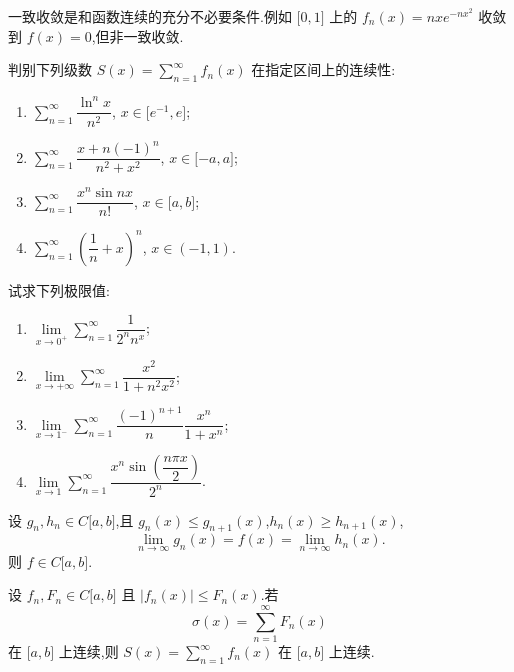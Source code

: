 \documentclass[../数学分析培优讲义.tex]{subfiles}
\begin{document}
\begin{remark}
一致收敛是和函数连续的充分不必要条件.例如 $\lbrack 0,1\rbrack$ 上的 $f_n(x)=nxe^{-nx^2}$ 收敛到 $f(x)=0$,但非一致收敛.
\end{remark}

\begin{example}
判别下列级数 $\displaystyle S(x)=\sum\limits_{n=1}^{\infty}f_n(x)$ 在指定区间上的连续性:
\begin{enumerate}[label=(\arabic*)]
    \item $\displaystyle\sum\limits_{n=1}^{\infty}\dfrac{\ln^n x}{n^2}$, $x\in\lbrack e^{-1},e\rbrack$;
    \item $\displaystyle\sum\limits_{n=1}^{\infty}\dfrac{x+n(-1)^n}{n^2+x^2}$, $x\in\lbrack -a,a\rbrack$;
    \item $\displaystyle\sum\limits_{n=1}^{\infty}\dfrac{x^n\sin nx}{n!}$, $x\in\lbrack a,b\rbrack$;
    \item $\displaystyle\sum\limits_{n=1}^{\infty}\left(\dfrac{1}{n}+x\right)^n$, $x\in(-1,1)$.
\end{enumerate}
\end{example}
\exampleblank

\begin{example}
试求下列极限值:
\begin{enumerate}[label=(\arabic*)]
    \item $\displaystyle\lim\limits_{x\to0^+}\sum\limits_{n=1}^{\infty}\dfrac{1}{2^n n^x}$;
    \item $\displaystyle\lim\limits_{x\to+\infty}\sum\limits_{n=1}^{\infty}\dfrac{x^2}{1+n^2x^2}$;
    \item $\displaystyle\lim\limits_{x\to1^-}\sum\limits_{n=1}^{\infty}\dfrac{(-1)^{n+1}}{n}\dfrac{x^n}{1+x^n}$;
    \item $\displaystyle\lim\limits_{x\to1}\sum\limits_{n=1}^{\infty}\dfrac{x^n\sin\left(\dfrac{n\pi x}{2}\right)}{2^n}$.
\end{enumerate}
\end{example}
\exampleblank

\begin{example}
设 $g_n,h_n\in C\lbrack a,b\rbrack$,且 $g_n(x)\leq g_{n+1}(x)$,$h_n(x)\geq h_{n+1}(x)$,
\[
    \lim\limits_{n\to\infty}g_n(x)=f(x)=\lim\limits_{n\to\infty}h_n(x).
\]
则 $f\in C\lbrack a,b\rbrack$.
\end{example}
\exampleblank

\begin{example}
设 $f_n,F_n\in C\lbrack a,b\rbrack$ 且 $|f_n(x)|\leq F_n(x)$.若
\[
    \sigma(x)=\sum\limits_{n=1}^{\infty}F_n(x)
\]
在 $\lbrack a,b\rbrack$ 上连续,则 $S(x)=\displaystyle\sum\limits_{n=1}^{\infty}f_n(x)$ 在 $\lbrack a,b\rbrack$ 上连续.
\end{example}
\exampleblank
\end{document}
